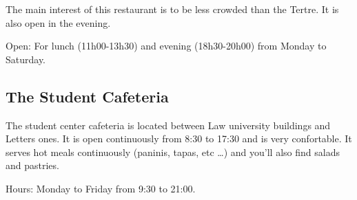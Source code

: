 
The main interest of this restaurant is to be less crowded than the Tertre. It is also open in the evening.

Open: For lunch (11h00-13h30) and evening (18h30-20h00) from Monday to Saturday.


\subsection {The Student Cafeteria}


The student center cafeteria is located between Law university buildings and Letters ones.
It is open continuously from 8:30 to 17:30 and is very confortable.
It serves hot meals continuously (paninis, tapas, etc \dots) and you'll also find salads and pastries.

Hours: Monday to Friday from 9:30 to 21:00.




